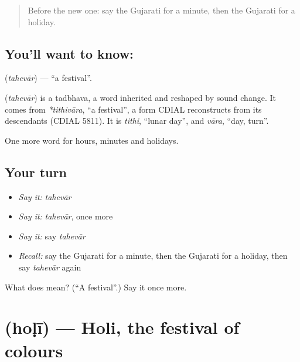 \label{lesson:GU-C80-festival}



\begin{quote}
Before the new one: say the Gujarati for a minute, then the Gujarati for a holiday.
\end{quote}

\subsection*{You'll want to know: }
\textbf{} (\emph{tahevār}) — \textquotedblleft{}a festival\textquotedblright{}.

\begin{cousinweb}
\textbf{} (\emph{tahevār}) is a tadbhava, a word inherited and reshaped by sound change. It comes from \emph{*tithivāra}, \textquotedblleft{}a festival\textquotedblright{}, a form CDIAL reconstructs from its descendants (CDIAL 5811). It is \emph{tithi}, \textquotedblleft{}lunar day\textquotedblright{}, and \emph{vāra}, \textquotedblleft{}day, turn\textquotedblright{}.
\end{cousinweb}

\begin{grammarlens}[title={What you've built}]
One more word for hours, minutes and holidays.
\end{grammarlens}

\subsection*{Your turn}
\begin{itemize}
\raggedright
  \item \emph{Say it:} \emph{tahevār}
  \item \emph{Say it:} \emph{tahevār}, once more
  \item \emph{Say it:} say \emph{tahevār}
  \item \emph{Recall:} say the Gujarati for a minute, then the Gujarati for a holiday, then say \emph{tahevār} again
\end{itemize}

\begin{tcolorbox}[breakable,colback=teal!4,colframe=teal!35!black,title={Before you move on}]
What does  mean? (\textquotedblleft{}A festival\textquotedblright{}.) Say it once more.
\end{tcolorbox}
\section[\texorpdfstring{\gu{હોળી} (hoḷī)}{હોળી (hoḷī)}]{ (hoḷī) — Holi, the festival of colours}

